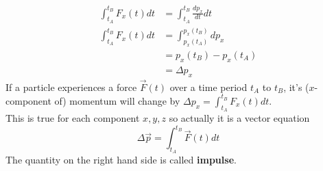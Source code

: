 \documentclass{article}
\begin{document}
\begin{align}
    \int_{t_A}^{t_B} F_x(t) dt &= \int_{t_A}^{t_B} \frac{dp_x}{dt} dt \\
    \int_{t_A}^{t_B} F_x(t) dt &= \int_{p_x(t_A)}^{p_x(t_B)} dp_x \\
    &= p_x(t_B) - p_x(t_A) \\
    &= \Delta p_x
\end{align}
If a particle experiences a force $\vec{F}(t)$ over a time period $t_A$ to $t_B$, it's ($x$-component of) momentum will change by $\Delta p_x = \int_{t_A}^{t_B} F_x(t) dt$.\\[10pt]
This is true for each component $x,y,z$ so actually it is a vector equation 
$$\Delta \vec{p} = \int_{t_A}^{t_B} \vec{F}(t) dt$$
The quantity on the right hand side is called \textbf{impulse}.
\end{document}
